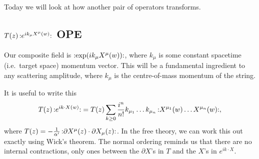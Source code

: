 
Today we will look at how another pair of operators transforms.

\subsection{\texorpdfstring{$T(z) \mathop{:}\nolimits\!e^{i k_{\mu} X^{\mu}(w)}\!\mathop{:}\nolimits$}{An Important} OPE}%
\label{sub:an_important_ope}

Our composite field is $\mathop{:}\nolimits\!\exp(i k_{\mu} X^{\mu}(w))\!\mathop{:}\nolimits$, where $k_{\mu}$ is some constant spacetime (i.e.~target space) momentum vector. This will be a fundamental ingredient to any scattering amplitude, where $k_{\mu}$ is the centre-of-mass momentum of the string.

It is useful to write this
\begin{equation}
  T(z) \mathop{:}\nolimits\!e^{i k \cdot X(w)}\!\mathop{:}\nolimits = T(z) \sum_{k \geq 0} \frac{i^n}{n!} k_{\mu_1} \dots k_{\mu_n} \mathop{:}\nolimits\!X^{\mu_1}(w) \dots X^{\mu_n}(w)\!\mathop{:}\nolimits,
\end{equation}
where $T(z) = -\frac{1}{\alpha'} \mathop{:}\nolimits\!\partial X^{\mu} (z) \cdot \partial X_{\mu}(z)\!\mathop{:}\nolimits$.
In the free theory, we can work this out exactly using Wick's theorem.
The normal ordering reminds us that there are no internal contractions, only ones between the $\partial X$'s in $T$ and the $X$'s in $e^{i k \cdot X}$.

